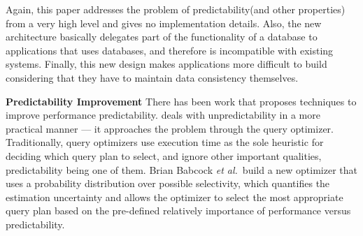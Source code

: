 Again, this paper addresses the problem of predictability(and other properties)
from a very high level and gives no implementation details. Also, the new
architecture basically delegates part of the functionality of a database
to applications that uses databases, and therefore is incompatible with
existing systems. Finally, this new design makes applications more difficult to
build considering that they have to maintain data consistency themselves.

\textbf{Predictability Improvement} There has been work that proposes 
techniques to improve performance predictability. \cite{babcock:optimizer} 
deals with unpredictability in a more practical manner --- it approaches the
problem through the query optimizer. Traditionally, query optimizers use
execution time as the sole heuristic for deciding which query plan to select,
and ignore other important qualities, predictability being one of them. Brian
Babcock \textit{et al.}\ build a new optimizer that uses a probability
distribution over possible selectivity, which quantifies the estimation
uncertainty and allows the optimizer to select the most appropriate query plan
based on the pre-defined relatively importance of performance versus
predictability.



